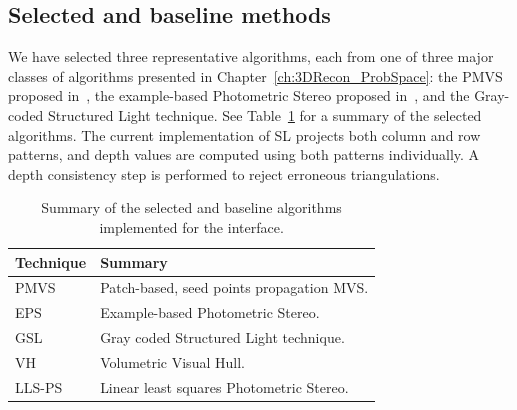\subsection{Selected and baseline methods}
We have selected three representative algorithms, each from one of three major classes of algorithms presented in Chapter~\ref{ch:3DRecon_ProbSpace}: the PMVS proposed in~\cite{furukawa2010accurate}, the example-based Photometric Stereo proposed in~\cite{hertzmann2005example}, and the Gray-coded Structured Light technique. See Table~\ref{tab:selected_algos} for a summary of the selected algorithms. The current implementation of SL projects both column and row patterns, and depth values are computed using both patterns individually. A depth consistency step is performed to reject erroneous triangulations.
\begin{table}[!htbp]
\centering
\begin{tabular}{l|l}
\toprule
Technique & Summary\\
\midrule
PMVS & Patch-based, seed points propagation MVS.\\
EPS & Example-based Photometric Stereo.\\
GSL & Gray coded Structured Light technique.\\
\midrule
VH & Volumetric Visual Hull.\\
LLS-PS & Linear least squares Photometric Stereo.\\
\bottomrule
\end{tabular}
\caption{Summary of the selected and baseline algorithms implemented for the interface.}
\label{tab:selected_algos}
\end{table}


